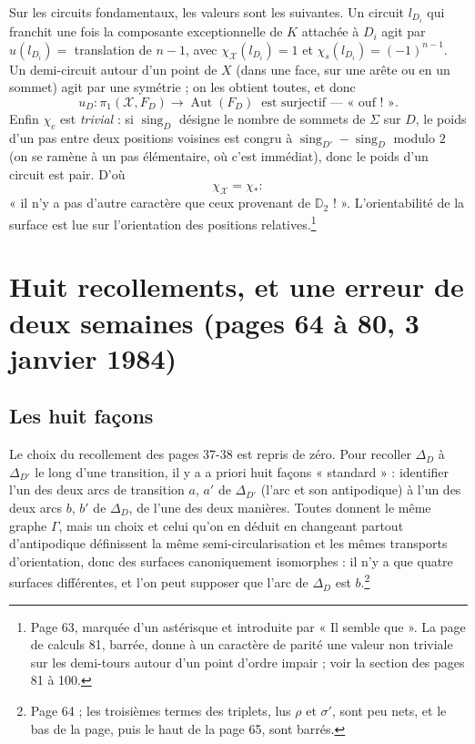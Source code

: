 \documentclass[11pt,a4paper]{article}
\begin{document}
Sur les circuits fondamentaux, les valeurs sont les suivantes. Un circuit
$l_{D_i}$ qui franchit une fois la composante exceptionnelle de $K$ attachée à
$D_i$ agit par $u(l_{D_i}) = $ translation de $n - 1$, avec
$\chi_{\mathcal{X}}(l_{D_i}) = 1$ et $\chi_s(l_{D_i}) = (-1)^{n-1}$. Un
demi-circuit autour d'un point de $X$ (dans une face, sur une arête ou en un
sommet) agit par une symétrie ; on les obtient toutes, et donc
\[
u_D : \pi_1(\mathcal{X}, F_D) \longrightarrow \operatorname{Aut}(F_D)
\ \text{ est surjectif — « ouf ! ».}
\]
Enfin $\chi_c$ est \emph{trivial} : si $\operatorname{sing}_D$ désigne le
nombre de sommets de $\Sigma$ sur $D$, le poids d'un pas entre deux positions
voisines est congru à $\operatorname{sing}_{D'} - \operatorname{sing}_D$ modulo
$2$ (on se ramène à un pas élémentaire, où c'est immédiat), donc le poids d'un
circuit est pair. D'où
\[
\chi_{\mathcal{X}} = \chi_{\ast} :
\]
« il n'y a pas d'autre caractère que ceux provenant de $\mathbb{D}_2$ ! ».
L'orientabilité de la surface est lue sur l'orientation des positions
relatives.\footnote{Page 63, marquée d'un astérisque et introduite par « Il
semble que ». La page de calculs 81, barrée, donne à un caractère de parité une
valeur non triviale sur les demi-tours autour d'un point d'ordre impair ; voir
la section des pages 81 à 100.}

\section*{Huit recollements, et une erreur de deux semaines (pages 64 à 80, 3 janvier 1984)}

\subsection*{Les huit façons}

Le choix du recollement des pages 37-38 est repris de zéro. Pour recoller
$\Delta_D$ à $\Delta_{D'}$ le long d'une transition, il y a a priori huit façons
« standard » : identifier l'un des deux arcs de transition $a$, $a'$ de
$\Delta_{D'}$ (l'arc et son antipodique) à l'un des deux arcs $b$, $b'$ de
$\Delta_D$, de l'une des deux manières. Toutes donnent le même graphe
$\Gamma$, mais un choix et celui qu'on en déduit en changeant partout
d'antipodique définissent la même semi-circularisation et les mêmes transports
d'orientation, donc des surfaces canoniquement isomorphes : il n'y a que quatre
surfaces différentes, et l'on peut supposer que l'arc de $\Delta_D$ est
$b$.\footnote{Page 64 ; les troisièmes termes des triplets, lus $\rho$ et
$\sigma'$, sont peu nets, et le bas de la page, puis le haut de la page 65, sont
barrés.}
\end{document}
